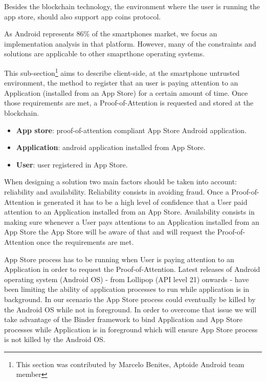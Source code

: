 Besides the blockchain technology, the environment where the user is running the app store, should also support app coins protocol.


As Android represents 86\% of the smartphones market, we focus an implementation analysis in that platform. However, many of the constraints and solutions are applicable to other smaprthone operating systems.

This sub-section\footnote{This section was contributed by Marcelo Benites, Aptoide Android team member} aims to describe client-side, at the smartphone untrusted environment, the method to register that an user is paying attention to an Application (installed from an App Store) for a certain amount of time. Once those requirements are met, a Proof-of-Attention is requested and stored at the blockchain.

\begin{itemize}
\item {\bf App store}: proof-of-attention compliant App Store Android application.
\item {\bf Application}: android application installed from App Store.
\item {\bf User}: user registered in App Store.
\end{itemize}

When designing a solution two main factors should be taken into account: reliability and availability. Reliability consists in avoiding fraud. Once a Proof-of-Attention is generated it has to be a high level of confidence that a User paid attention to an Application installed from an App Store. Availability consists in making sure whenever a User pays attentions to an Application installed from an App Store the App Store will be aware of that and will request the Proof-of-Attention once the requirements are met.

App Store process has to be running when User is paying attention to an Application in order to request  the Proof-of-Attention. Latest releases of Android operating system (Android OS) - from Lollipop (API level 21) onwards - have been limiting the ability of application processes to run while application is in background. In our scenario the App Store process could eventually be killed by the Android OS while not in foreground. In order to overcome that issue we will take advantage of the Binder framework to bind Application and App Store processes while Application is in foreground which will ensure App Store process is not killed by the Android OS.

